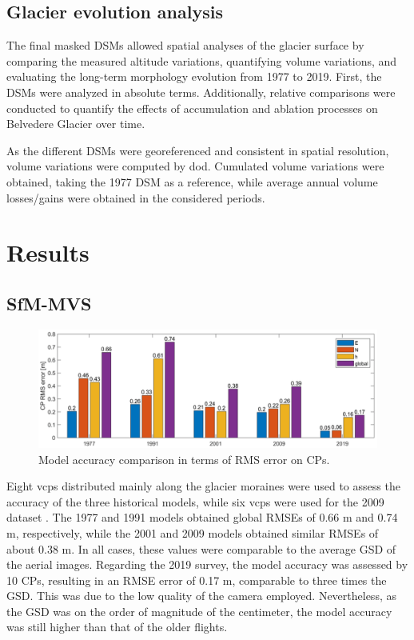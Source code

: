 \subsection{Glacier evolution analysis}\label{sec:2:glacier_evolution}

The final masked DSMs allowed spatial analyses of the glacier surface by comparing the measured altitude variations, quantifying volume variations, and evaluating the long-term morphology evolution from 1977 to 2019. 
First, the DSMs were analyzed in absolute terms.
Additionally, relative comparisons were conducted to quantify the effects of accumulation and ablation processes on Belvedere Glacier over time.

As the different DSMs were georeferenced and consistent in spatial resolution, volume variations were computed by \ac{dod}.
Cumulated volume variations were obtained, taking the 1977 DSM as a reference, while average annual volume losses/gains were obtained in the considered periods.

\section{Results}\label{sec:2:results}

\subsection{SfM-MVS}\label{sec:2:res_reconstruction}

\begin{figure}[hb]
    \centering
    \includegraphics[width=1\textwidth]{cp_error.png}
    \caption{Model accuracy comparison in terms of RMS error on CPs. }
    \label{fig:2:cp_error}
\end{figure}

Eight \acp{vcp} distributed mainly along the glacier moraines were used to assess the accuracy of the three historical models, while six \acp{vcp} were used for the 2009 dataset .
The 1977 and 1991 models obtained global RMSEs of 0.66 m and 0.74 m, respectively, while the 2001 and 2009 models obtained similar RMSEs of about 0.38 m.
In all cases, these values were comparable to the average GSD of the aerial images. 
Regarding the 2019 survey, the model accuracy was assessed by 10 CPs, resulting in an RMSE error of 0.17 m, comparable to three times the GSD. 
This was due to the low quality of the camera employed. 
Nevertheless, as the GSD was on the order of magnitude of the centimeter, the model accuracy was still higher than that of the older flights.


